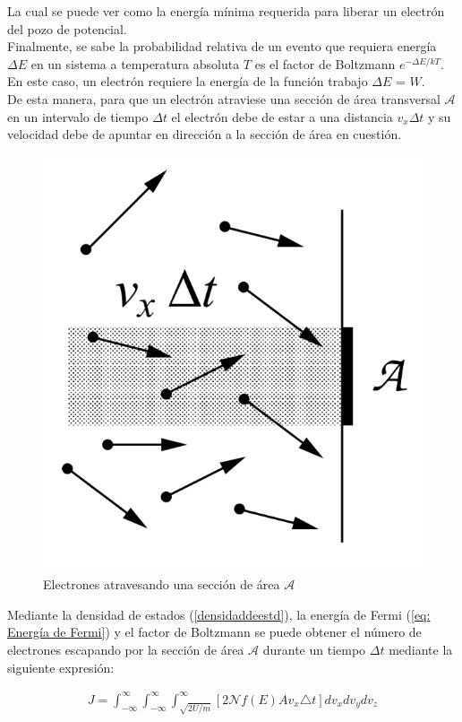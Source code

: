 \documentclass[%
 reprint,
 amsmath,amssymb,
 aps,
]{revtex4-2}
\begin{document}
\vspace{0.2 cm}
La cual se puede ver como la energía mínima requerida para liberar un electrón del pozo de potencial.
\\

Finalmente, se sabe  la probabilidad relativa de un evento que requiera energía $\Delta E$ en un sistema a temperatura absoluta $T$ es el factor de Boltzmann $e^{-\Delta E/kT}$. En este caso, un electrón requiere la energía de la función trabajo $\Delta E$ = $W$. 
\\

De esta manera, para que un electrón atraviese una sección de área transversal $\mathcal{A}$ en un intervalo de tiempo $\Delta t$ el electrón debe de estar a una distancia $v_{x}\Delta t$ y su velocidad debe de apuntar en dirección a la sección de área en cuestión.
\\

\begin{figure}[H]
    \centering
    \includegraphics[width=0.5\linewidth]{imagenes/Opera Captura de pantalla_2024-03-13_211045_mail.google.com.png}
    \caption{Electrones atravesando una sección de área $\mathcal{A}$}
    \label{fig:enter-label}
\end{figure}

Mediante la densidad de estados (\ref{densidaddeestd}), la energía de Fermi (\ref{eq: Energía de Fermi}) y el factor de Boltzmann se puede obtener el número de electrones escapando por la sección de área $\mathcal{A}$ durante un tiempo $\Delta t$ mediante la siguiente expresión:

\begin{align*}
    J= \int_{-\infty}^{\infty} \int_{-\infty}^{\infty} \int_{\sqrt{2U/m}}^{\infty}\left[2\mathcal{N}f(E)Av_{x}\triangle t \right] dv_{x}dv_{y}dv_{z}
\end{align*}
\end{document}
